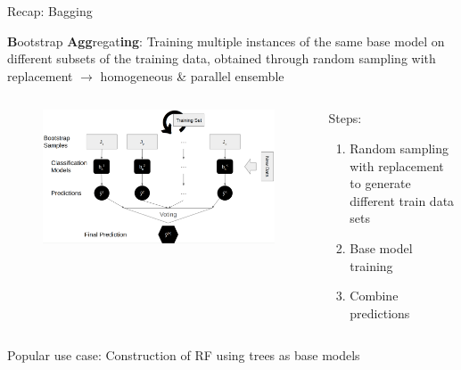 \documentclass[10pt,compress,t,notes=noshow, xcolor=table]{beamer}
\begin{document}

\begin{vbframe}{Recap: Bagging}

\textbf{B}ootstrap \textbf{Agg}regat\textbf{ing}: Training multiple instances of the same base model on different subsets of the training data, obtained through random sampling with replacement $\rightarrow$ homogeneous \& parallel ensemble
\vfill
\begin{columns}
    \begin{column}{0.6\textwidth}
        \vspace{-1em}
        \begin{figure}
            \centering
            \includegraphics{figure/bagging_better.png}
            \label{fig:bagging}
        \end{figure}
    \end{column}
    \begin{column}{0.4\textwidth}
        Steps:
        \begin{enumerate}
            \item Random sampling with replacement to generate different train data sets
            \item Base model training
            \item Combine predictions
        \end{enumerate}
    \end{column}
\end{columns}
\vfill
Popular use case: Construction of RF using trees as base models

\end{vbframe}
\end{document}
